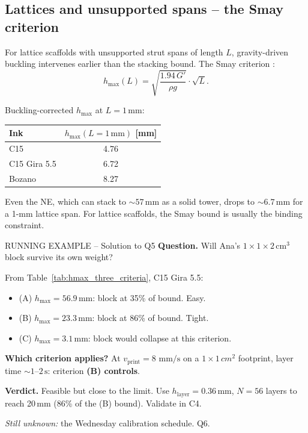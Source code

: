 \documentclass[11pt,a4paper]{article}
\newcommand{\mms}{\,\mathrm{mm/s}}
\begin{document}
\subsection{Lattices and unsupported spans -- the Smay criterion}

For lattice scaffolds with unsupported strut spans of length $L$,
gravity-driven buckling intervenes earlier than the stacking bound.
The Smay criterion \citep{HabibKhoda2018}:
\begin{equation}
h_\mathrm{max}(L) = \sqrt{\frac{1.94\,G'}{\rho g}}\cdot\sqrt{L}.
\label{eq:smay}
\end{equation}

\begin{examplebox}
Buckling-corrected $h_\mathrm{max}$ at $L=1\,\si{\mm}$:

\medskip\centering
\begin{tabular}{lc}
\toprule
Ink & $h_\mathrm{max}(L=1\,\si{\mm})$ [\si{\mm}] \\
\midrule
C15           & 4.76 \\
C15 Gira 5.5  & 6.72 \\
Bozano        & 8.27 \\
\bottomrule
\end{tabular}

\medskip\flushleft
Even the NE, which can stack to $\sim 57\,\si{\mm}$ as a solid tower,
drops to $\sim 6.7\,\si{\mm}$ for a 1-\si{\mm} lattice span. For
lattice scaffolds, the Smay bound is usually the binding constraint.
\end{examplebox}

\begin{runningbox}{RUNNING EXAMPLE -- Solution to Q5}
\textbf{Question.} Will Ana's $1\times 1\times 2$\,cm$^3$ block survive
its own weight?

\medskip From Table~\ref{tab:hmax_three_criteria}, C15 Gira 5.5:
\begin{itemize}[leftmargin=1.4em,itemsep=1pt]
\item (A) $h_\mathrm{max}=56.9\,\si{\mm}$: block at 35\% of bound. Easy.
\item (B) $h_\mathrm{max}=23.3\,\si{\mm}$: block at 86\% of bound. Tight.
\item (C) $h_\mathrm{max}=3.1\,\si{\mm}$: block would collapse at this
  criterion.
\end{itemize}
\textbf{Which criterion applies?} At $v_\mathrm{print}=8\,\mms$ on a
$1\times 1\,\si{cm^2}$ footprint, layer time $\sim 1$--$2\,\si{\s}$:
criterion \textbf{(B) controls}.

\textbf{Verdict.} Feasible but close to the limit. Use
$h_\mathrm{layer}=0.36\,\si{\mm}$, $N=56$ layers to reach 20\,\si{\mm}
(86\% of the (B) bound). Validate in C4.

\medskip\emph{Still unknown:} the Wednesday calibration schedule. Q6.
\end{runningbox}
\end{document}
